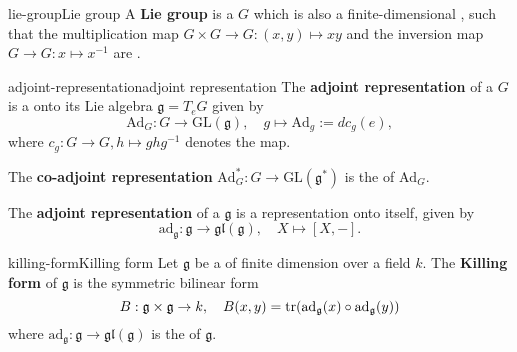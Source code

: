 \begin{topic}{lie-group}{Lie group}
    A \textbf{Lie group} is a  $G$ which is also a finite-dimensional , such that the multiplication map $G \times G \to G : (x, y) \mapsto xy$ and the inversion map $G \to G : x \mapsto x^{-1}$ are .
\end{topic}

\begin{topic}{adjoint-representation}{adjoint representation}
    The \textbf{adjoint representation} of a  $G$ is a  onto its Lie algebra $\mathfrak{g} = T_e G$ given by
    \[ \text{Ad}_G : G \to \text{GL}(\mathfrak{g}), \quad g \mapsto \text{Ad}_g := d c_g(e) , \]
    where $c_g : G \to G, h \mapsto g h g^{-1}$ denotes the  map.
    
    The \textbf{co-adjoint representation} $\text{Ad}_G^* : G \to \text{GL}(\mathfrak{g}^*)$ is the  of $\text{Ad}_G$.
    
    The \textbf{adjoint representation} of a  $\mathfrak{g}$ is a representation onto itself, given by
    \[ \text{ad}_{\mathfrak{g}}: \mathfrak{g} \to \mathfrak{gl}(\mathfrak{g}), \quad X \mapsto [X, -] . \]
\end{topic}

\begin{topic}{killing-form}{Killing form}
    Let $\mathfrak{g}$ be a  of finite dimension over a field $k$. The \textbf{Killing form} of $\mathfrak{g}$ is the symmetric bilinear form
    \[ B : \mathfrak{g} \times \mathfrak{g} \to k, \quad B(x, y) = \textup{tr}(\textup{ad}_{\mathfrak{g}}(x) \circ \textup{ad}_{\mathfrak{g}}(y)) \]
    where $\text{ad}_\mathfrak{g} : \mathfrak{g} \to \mathfrak{gl}(\mathfrak{g})$ is the  of $\mathfrak{g}$.
\end{topic}
